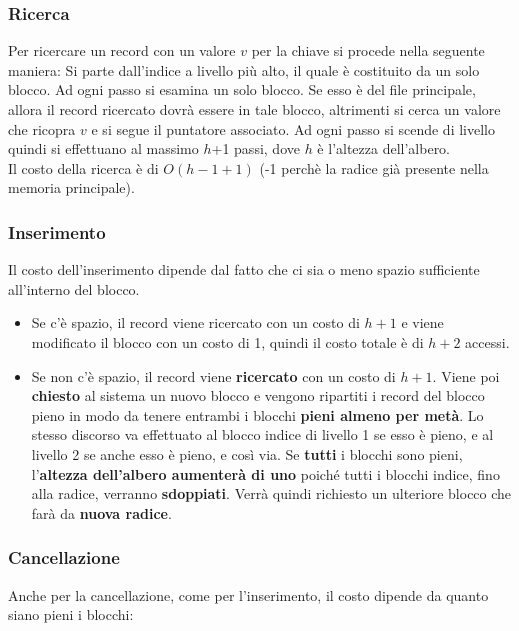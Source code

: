 \documentclass{article}
\begin{document}
\subsubsection{Ricerca}
Per ricercare un record con un valore $v$ per la chiave si procede nella seguente maniera: Si parte dall'indice a livello più alto, il quale è costituito da un solo blocco. Ad ogni passo si esamina un solo blocco. Se esso è del file principale, allora il record ricercato dovrà essere in tale blocco, altrimenti si cerca un valore che ricopra $v$ e si segue il puntatore associato. Ad ogni passo si scende di livello quindi si effettuano al massimo $h$+1 passi, dove $h$ è l'altezza dell'albero.\\
Il costo della ricerca è di $O(h - 1 + 1)$ (-1 perchè la radice già presente nella memoria principale).

\subsubsection{Inserimento}
Il costo dell'inserimento dipende dal fatto che ci sia o meno spazio sufficiente all'interno del blocco.

\begin{itemize}
    \item Se c'è spazio, il record viene ricercato con un costo di $h+1$ e viene modificato il blocco con un costo di 1, quindi il costo totale è di $h+2$ accessi.
    \item Se non c'è spazio, il record viene \textbf{ricercato} con un costo di $h+1$. Viene poi \textbf{chiesto} al sistema un nuovo blocco e vengono ripartiti i record del blocco pieno in modo da tenere entrambi i blocchi \textbf{pieni almeno per metà}. Lo stesso discorso va effettuato al blocco indice di livello 1 se esso è pieno, e al livello 2 se anche esso è pieno, e così via. Se \textbf{tutti} i blocchi sono pieni, l'\textbf{altezza dell'albero aumenterà di uno} poiché tutti i blocchi indice, fino alla radice, verranno \textbf{sdoppiati}. Verrà quindi richiesto un ulteriore blocco che farà da \textbf{nuova radice}.
\end{itemize}

\subsubsection{Cancellazione}
Anche per la cancellazione, come per l'inserimento, il costo dipende da quanto siano pieni i blocchi:
\end{document}
